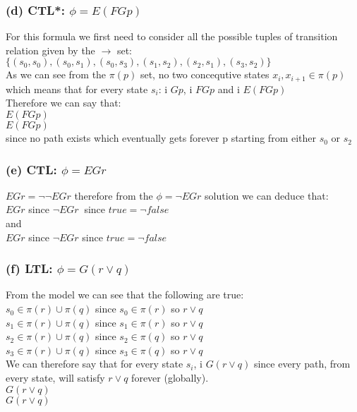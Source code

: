 \documentclass[a4paper]{article}
\begin{document}
\subsubsection*{(d) CTL*: $\phi = E(FGp)$}
For this formula we first need to consider all the possible tuples of transition relation given by the $\rightarrow$ set:
\\[0.25cm]
$ \{(s_0,s_0),(s_0,s_1),(s_0,s_3),(s_1,s_2),(s_2,s_1),(s_3,s_2) \}$ 
\\[0.50cm]
As we can see from the $\pi(p)$ set, no two concequtive states $x_i,x_{i+1} \in \pi(p)$ which means that for every state $s_i$: \nholds i $Gp$, \nholds i $FGp$
and  \nholds i $E(FGp)$ \\[0.25cm]
Therefore we can say that: \\[0.25cm]
 $E(FGp)$
\\[0.25cm]
 $E(FGp)$
\\[0.25cm]
since no path exists which eventually gets forever p starting from either $s_0$ or $s_2$

\subsubsection*{(e) CTL: $\phi = EGr$}
$ EGr = \neg \neg EGr $ therefore from the $\phi = \neg EGr$ solution we can deduce that:\\[0.25cm]
 $EGr$ since  $\neg EGr\:$ since $true = \neg false$
\\[0.25cm]
and
\\[0.25cm]
 $EGr$ since  $\neg EGr$  since $true = \neg false$
\subsubsection*{(f) LTL: $\phi = G(r \vee q)$}
From the model we can see that the following are true:
\\[0.25cm]
$s_0 \in \pi(r) \cup \pi(q) $ since $s_0 \in \pi(r)$ so  $r \vee q$
\\[0.25cm]
$s_1 \in \pi(r) \cup \pi(q) $ since $s_1 \in \pi(r)$ so  $r \vee q$
\\[0.25cm]
$s_2 \in \pi(r) \cup \pi(q) $ since $s_2 \in \pi(q)$ so  $r \vee q$
\\[0.25cm]
$s_3 \in \pi(r) \cup \pi(q) $ since $s_3 \in \pi(q)$ so  $r \vee q$
\\[0.25cm]
We can therefore say that for every state $s_i$, \holds i $G(r \vee q)$ since every path, from every state, will satisfy $r \vee q$ forever (globally).
\\[0.25cm]
 $G(r \vee q)$
\\[0.25cm]
 $G(r \vee q)$
\end{document}
